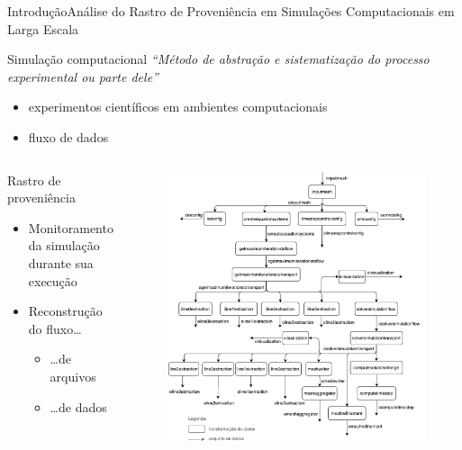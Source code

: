 \documentclass[12pt,compress,final]{beamer}
\newcommand{\nologo}{\setbeamertemplate{logo}{}} %
\begin{document}
{\nologo
\begin{frame}{Introdução}{Análise do \alert{Rastro de Proveniência} em \alert{Simulações Computacionais} em Larga Escala}

    \begin{alertblock}{Simulação computacional}
    \textit{``Método de abstração e sistematização do processo experimental ou parte dele''}
    \smallskip
    \begin{itemize}
        \item experimentos científicos em ambientes computacionais
        \item fluxo de dados
    \end{itemize}
    \end{alertblock}
    
    \begin{columns}
    \begin{block}{Rastro de proveniência}
    \begin{itemize}
        \item Monitoramento da simulação durante sua execução
        \item Reconstrução do fluxo\ldots{}
        \begin{itemize}
            \item \ldots{}de arquivos %
            \item \ldots{}de dados %
        \end{itemize}
    \end{itemize}
    \end{block}
    \begin{figure}
    \includegraphics[width=.9\textwidth]{img/experiments-dataflow.pdf}
    \end{figure}
    \end{columns}
    
\end{frame}
}
\end{document}
